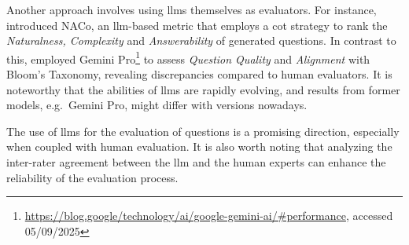 
 Another approach involves using \ac{llms} themselves as evaluators. For instance, \cite{nguyen_reference-based_2024} introduced NACo, an \ac{llm}-based metric that employs a \ac{cot} strategy to rank the \textit{Naturalness, Complexity} and \textit{Answerability} of generated questions. In contrast to this, \cite{scaria_how_2024} employed Gemini Pro\footnote{\url{https://blog.google/technology/ai/google-gemini-ai/\#performance}, accessed 05/09/2025} to assess \textit{Question Quality} and \textit{Alignment} with Bloom's Taxonomy, revealing discrepancies compared to human evaluators. It is noteworthy that the abilities of \ac{llms} are rapidly evolving, and results from former models, e.g.\ Gemini Pro, might differ with versions nowadays. 


The use of \ac{llms} for the evaluation of questions is a promising direction, especially when coupled with human evaluation. It is also worth noting that analyzing the inter-rater agreement between the \ac{llm} and the human experts can enhance the reliability of the evaluation process.
